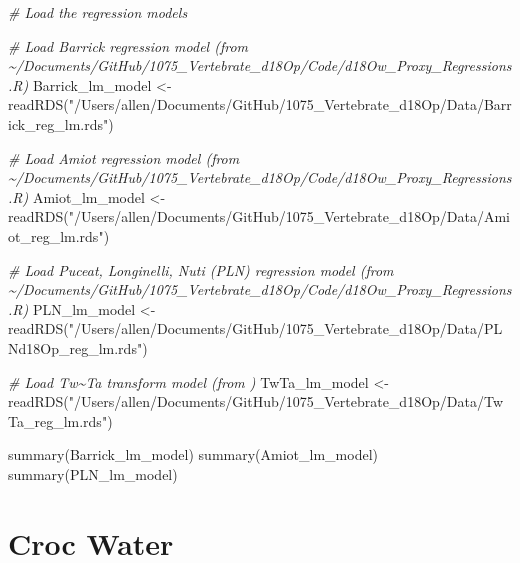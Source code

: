 \documentclass[
]{article}
\newenvironment{Shaded}{\begin{snugshade}}{\end{snugshade}}
\newcommand{\CommentTok}[1]{\textcolor[rgb]{0.56,0.35,0.01}{\textit{#1}}}
\newcommand{\FunctionTok}[1]{\textcolor[rgb]{0.00,0.00,0.00}{#1}}
\newcommand{\NormalTok}[1]{#1}
\newcommand{\OtherTok}[1]{\textcolor[rgb]{0.56,0.35,0.01}{#1}}
\newcommand{\StringTok}[1]{\textcolor[rgb]{0.31,0.60,0.02}{#1}}
\begin{document}
\begin{Shaded}
\begin{Highlighting}[]
\CommentTok{\# Load the regression models}

\CommentTok{\# Load Barrick regression model (from \textasciitilde{}/Documents/GitHub/1075\_Vertebrate\_d18Op/Code/d18Ow\_Proxy\_Regressions.R)}
\NormalTok{Barrick\_lm\_model }\OtherTok{\textless{}{-}} \FunctionTok{readRDS}\NormalTok{(}\StringTok{"/Users/allen/Documents/GitHub/1075\_Vertebrate\_d18Op/Data/Barrick\_reg\_lm.rds"}\NormalTok{)}

\CommentTok{\# Load Amiot regression model (from \textasciitilde{}/Documents/GitHub/1075\_Vertebrate\_d18Op/Code/d18Ow\_Proxy\_Regressions.R)}
\NormalTok{Amiot\_lm\_model }\OtherTok{\textless{}{-}} \FunctionTok{readRDS}\NormalTok{(}\StringTok{"/Users/allen/Documents/GitHub/1075\_Vertebrate\_d18Op/Data/Amiot\_reg\_lm.rds"}\NormalTok{)}

\CommentTok{\# Load Puceat, Longinelli, Nuti (PLN) regression model (from \textasciitilde{}/Documents/GitHub/1075\_Vertebrate\_d18Op/Code/d18Ow\_Proxy\_Regressions.R)}
\NormalTok{PLN\_lm\_model }\OtherTok{\textless{}{-}} \FunctionTok{readRDS}\NormalTok{(}\StringTok{"/Users/allen/Documents/GitHub/1075\_Vertebrate\_d18Op/Data/PLNd18Op\_reg\_lm.rds"}\NormalTok{)}

\CommentTok{\# Load Tw\textasciitilde{}Ta transform model (from )}
\NormalTok{TwTa\_lm\_model }\OtherTok{\textless{}{-}} \FunctionTok{readRDS}\NormalTok{(}\StringTok{"/Users/allen/Documents/GitHub/1075\_Vertebrate\_d18Op/Data/TwTa\_reg\_lm.rds"}\NormalTok{)}


\FunctionTok{summary}\NormalTok{(Barrick\_lm\_model)}
\FunctionTok{summary}\NormalTok{(Amiot\_lm\_model)}
\FunctionTok{summary}\NormalTok{(PLN\_lm\_model)}
\end{Highlighting}
\end{Shaded}

\hypertarget{croc-water}{%
\section{Croc Water}\label{croc-water}}
\end{document}
